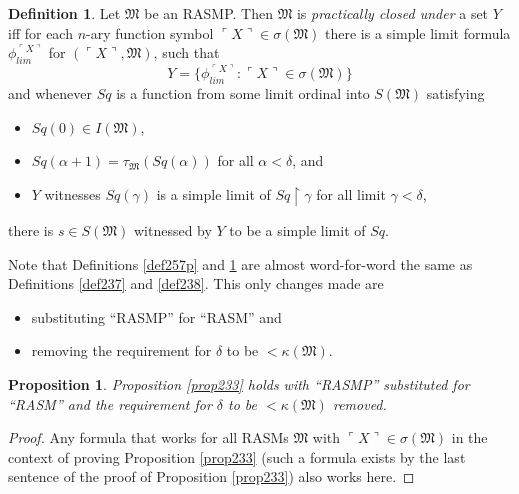 \documentclass[12pt, twoside]{memoir}
\numberwithin{equation}{section}
\newtheorem{prop}[thm]{Proposition}
\theoremstyle{definition}
\newtheorem{defi}[thm]{Definition}
\theoremstyle{remark}
\theoremstyle{definition}
\theoremstyle{definition}
\theoremstyle{definition}
\theoremstyle{remark}
\begin{document}
\begin{defi}\label{def258}
Let $\mathfrak{M}$ be an RASMP. Then $\mathfrak{M}$ is \emph{practically closed under} a set $Y$ iff for each $n$-ary function symbol $\ulcorner X \urcorner \in \sigma(\mathfrak{M})$ there is a simple limit formula $\phi_{lim}^{\ulcorner X \urcorner}$ for $(\ulcorner X \urcorner, \mathfrak{M})$, such that 
\begin{equation*}
    Y = \{\phi_{lim}^{\ulcorner X \urcorner} : \ulcorner X \urcorner \in \sigma(\mathfrak{M})\}
\end{equation*}
and whenever $Sq$ is a function from some limit ordinal into $S(\mathfrak{M})$ satisfying
\begin{itemize}
    \item $Sq(0) \in I(\mathfrak{M})$,
    \item $Sq(\alpha + 1) = \tau_{\mathfrak{M}}(Sq(\alpha))$ for all $\alpha < \delta$, and
    \item $Y$ witnesses $Sq(\gamma)$ is a simple limit of $Sq \restriction \gamma$ for all limit $\gamma < \delta$,
\end{itemize}
there is $s \in S(\mathfrak{M})$ witnessed by $Y$ to be a simple limit of $Sq$.
\end{defi}

Note that Definitions \ref{def257p} and \ref{def258} are almost word-for-word the same as Definitions \ref{def237} and \ref{def238}. This only changes made are \begin{itemize}
    \item substituting ``RASMP'' for ``RASM'' and 
    \item removing the requirement for $\delta$ to be $< \kappa(\mathfrak{M})$.
\end{itemize} 

\begin{prop}\label{prop261c}
Proposition \ref{prop233} holds with ``RASMP'' substituted for ``RASM'' and the requirement for $\delta$ to be $< \kappa(\mathfrak{M})$ removed.
\end{prop}

\begin{proof}
Any formula that works for all RASMs $\mathfrak{M}$ with $\ulcorner X \urcorner \in \sigma(\mathfrak{M})$ in the context of proving Proposition \ref{prop233} (such a formula exists by the last sentence of the proof of Proposition \ref{prop233}) also works here.
\end{proof}
\end{document}
